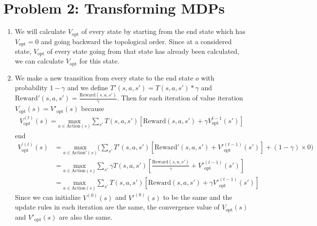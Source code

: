 \documentclass[12pt]{article}
\begin{document}
\section*{Problem 2: Transforming MDPs}
\begin{enumerate}[label=(\alph*)]
    \addtocounter{enumi}{1}
    \item
    We will calculate $V_{\text{opt}}$ of every state by starting from the end state which has $V_{\text{opt}} = 0$ and going backward the topological order. Since at a considered state, $V_{\text{opt}}$ of every state going from that state has already been calculated, we can calculate $V_{\text{opt}}$ for this state.
    \item
    We make a new transition from every state to the end state $o$ with probability $1 - \gamma$ and we define $T'(s,a,s') = T(s,a,s')*\gamma$ and $\text{Reward}'(s,a,s') = \frac{\text{Reward}(s,a,s')}{\gamma}$. Then for each iteration of value iteration $V_{\text{opt}}(s) = V'_{\text{opt}}(s)$ because
    \begin{align*}
        V^{(t)}_{\text{opt}}(s) = \underset{a \in \text{Action}(s)}{\text{max}}\sum_{s'}T(s,a,s')[\text{Reward}(s,a,s') + \gamma V^{t-1}_\text{opt}(s')]
    \end{align*}
    end
    \begin{align*}
        V^{'(t)}_{\text{opt}}(s) &= \underset{a \in \text{Action}'(s)}{\text{max}}\Big(\sum_{s'}T'(s,a,s')[\text{Reward}'(s,a,s') + V'^{(t-1)}_\text{opt}(s')] + (1 - \gamma) \times 0\Big) \\
        &= \underset{a \in \text{Action}(s)}{\text{max}}\sum_{s'} \gamma T(s,a,s')[\frac{\text{Reward}(s,a,s')}{\gamma} + V'^{(t-1)}_\text{opt}(s')] \\
        &= \underset{a \in \text{Action}(s)}{\text{max}}\sum_{s'}T(s,a,s')[\text{Reward}(s,a,s') + \gamma V'^{(t-1)}_\text{opt}(s')]
    \end{align*}
    Since we can initialize $V^{(0)}(s)$ and $V'^{(0)}(s)$ to be the same and the update rules in each iteration are the same, the convergence value of $V_\text{opt}(s)$ and $V'_\text{opt}(s)$ are also the same.
\end{enumerate}
\end{document}
